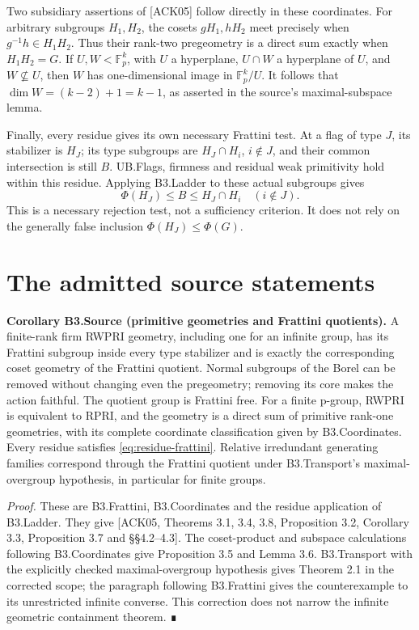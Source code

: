 Two subsidiary assertions of {[}ACK05{]} follow directly in these coordinates. For arbitrary subgroups \(H_1,H_2\), the cosets \(gH_1,hH_2\) meet precisely when \(g^{-1}h\in H_1H_2\). Thus their rank-two pregeometry is a direct sum exactly when \(H_1H_2=G\). If \(U,W<\mathbb F_p^k\), with \(U\) a hyperplane, \(U\cap W\) a hyperplane of \(U\), and \(W\not\subseteq U\), then \(W\) has one-dimensional image in \(\mathbb F_p^k/U\). It follows that \(\dim W=(k-2)+1=k-1\), as asserted in the source's maximal-subspace lemma.

Finally, every residue gives its own necessary Frattini test. At a flag of type \(J\), its stabilizer is \(H_J\); its type subgroups are \(H_J\cap H_i\), \(i\notin J\), and their common intersection is still \(B\). UB.Flags, firmness and residual weak primitivity hold within this residue. Applying B3.Ladder to these actual subgroups gives \begin{equation}
\Phi(H_J)\leq B\leq H_J\cap H_i\quad(i\notin J).
\label{eq:residue-frattini}
\end{equation} This is a necessary rejection test, not a sufficiency criterion. It does not rely on the generally false inclusion \(\Phi(H_J)\leq\Phi(G)\).
\section{The admitted source statements}
\textbf{Corollary B3.Source (primitive geometries and Frattini quotients).} A finite-rank firm RWPRI geometry, including one for an infinite group, has its Frattini subgroup inside every type stabilizer and is exactly the corresponding coset geometry of the Frattini quotient. Normal subgroups of the Borel can be removed without changing even the pregeometry; removing its core makes the action faithful. The quotient group is Frattini free. For a finite p-group, RWPRI is equivalent to RPRI, and the geometry is a direct sum of primitive rank-one geometries, with its complete coordinate classification given by B3.Coordinates. Every residue satisfies \eqref{eq:residue-frattini}. Relative irredundant generating families correspond through the Frattini quotient under B3.Transport's maximal-overgroup hypothesis, in particular for finite groups.

\emph{Proof.} These are B3.Frattini, B3.Coordinates and the residue application of B3.Ladder. They give {[}ACK05, Theorems 3.1, 3.4, 3.8, Proposition 3.2, Corollary 3.3, Proposition 3.7 and §§4.2--4.3{]}. The coset-product and subspace calculations following B3.Coordinates give Proposition 3.5 and Lemma 3.6. B3.Transport with the explicitly checked maximal-overgroup hypothesis gives Theorem 2.1 in the corrected scope; the paragraph following B3.Frattini gives the counterexample to its unrestricted infinite converse. This correction does not narrow the infinite geometric containment theorem. ∎

